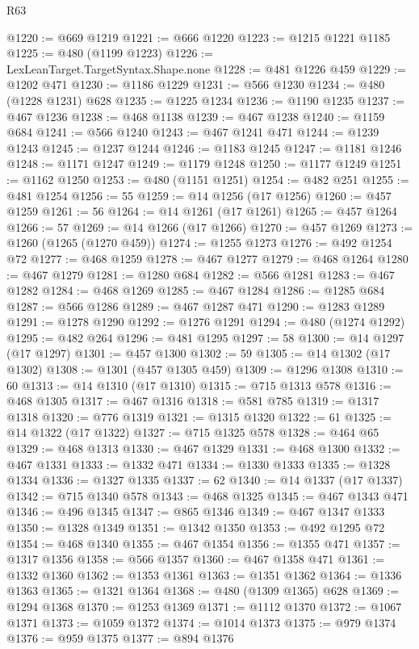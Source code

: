\begin{lexlean}{R63}
\begin{coremodule}
@1220 := @669 @1219
@1221 := @666 @1220
@1223 := @1215 @1221 @1185
@1225 := @480 (@1199 @1223)
@1226 := LexLeanTarget.TargetSyntax.Shape.none
@1228 := @481 @1226 @459
@1229 := @1202 @471
@1230 := @1186 @1229
@1231 := @566 @1230
@1234 := @480 (@1228 @1231) @628
@1235 := @1225 @1234
@1236 := @1190 @1235
@1237 := @467 @1236
@1238 := @468 @1138
@1239 := @467 @1238
@1240 := @1159 @684
@1241 := @566 @1240
@1243 := @467 @1241 @471
@1244 := @1239 @1243
@1245 := @1237 @1244
@1246 := @1183 @1245
@1247 := @1181 @1246
@1248 := @1171 @1247
@1249 := @1179 @1248
@1250 := @1177 @1249
@1251 := @1162 @1250
@1253 := @480 (@1151 @1251)
@1254 := @482 @251
@1255 := @481 @1254
@1256 := 55
@1259 := @14 @1256 (@17 @1256)
@1260 := @457 @1259
@1261 := 56
@1264 := @14 @1261 (@17 @1261)
@1265 := @457 @1264
@1266 := 57
@1269 := @14 @1266 (@17 @1266)
@1270 := @457 @1269
@1273 := @1260 (@1265 (@1270 @459))
@1274 := @1255 @1273
@1276 := @492 @1254 @72
@1277 := @468 @1259
@1278 := @467 @1277
@1279 := @468 @1264
@1280 := @467 @1279
@1281 := @1280 @684
@1282 := @566 @1281
@1283 := @467 @1282
@1284 := @468 @1269
@1285 := @467 @1284
@1286 := @1285 @684
@1287 := @566 @1286
@1289 := @467 @1287 @471
@1290 := @1283 @1289
@1291 := @1278 @1290
@1292 := @1276 @1291
@1294 := @480 (@1274 @1292)
@1295 := @482 @264
@1296 := @481 @1295
@1297 := 58
@1300 := @14 @1297 (@17 @1297)
@1301 := @457 @1300
@1302 := 59
@1305 := @14 @1302 (@17 @1302)
@1308 := @1301 (@457 @1305 @459)
@1309 := @1296 @1308
@1310 := 60
@1313 := @14 @1310 (@17 @1310)
@1315 := @715 @1313 @578
@1316 := @468 @1305
@1317 := @467 @1316
@1318 := @581 @785
@1319 := @1317 @1318
@1320 := @776 @1319
@1321 := @1315 @1320
@1322 := 61
@1325 := @14 @1322 (@17 @1322)
@1327 := @715 @1325 @578
@1328 := @464 @65
@1329 := @468 @1313
@1330 := @467 @1329
@1331 := @468 @1300
@1332 := @467 @1331
@1333 := @1332 @471
@1334 := @1330 @1333
@1335 := @1328 @1334
@1336 := @1327 @1335
@1337 := 62
@1340 := @14 @1337 (@17 @1337)
@1342 := @715 @1340 @578
@1343 := @468 @1325
@1345 := @467 @1343 @471
@1346 := @496 @1345
@1347 := @865 @1346
@1349 := @467 @1347 @1333
@1350 := @1328 @1349
@1351 := @1342 @1350
@1353 := @492 @1295 @72
@1354 := @468 @1340
@1355 := @467 @1354
@1356 := @1355 @471
@1357 := @1317 @1356
@1358 := @566 @1357
@1360 := @467 @1358 @471
@1361 := @1332 @1360
@1362 := @1353 @1361
@1363 := @1351 @1362
@1364 := @1336 @1363
@1365 := @1321 @1364
@1368 := @480 (@1309 @1365) @628
@1369 := @1294 @1368
@1370 := @1253 @1369
@1371 := @1112 @1370
@1372 := @1067 @1371
@1373 := @1059 @1372
@1374 := @1014 @1373
@1375 := @979 @1374
@1376 := @959 @1375
@1377 := @894 @1376

\end{coremodule}
\end{lexlean}
